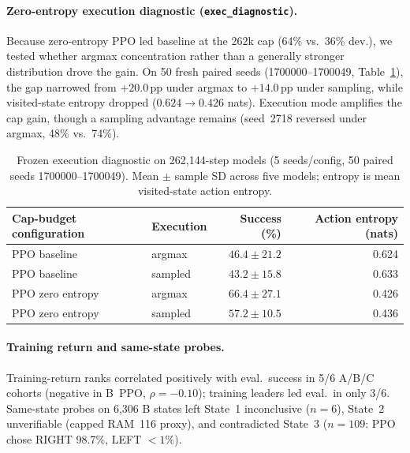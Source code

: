 \paragraph{Zero-entropy execution diagnostic (\texttt{exec\_diagnostic}).}
Because zero-entropy PPO led baseline at the 262k cap (64\% vs.\ 36\% dev.), we tested whether
argmax concentration rather than a generally stronger distribution drove the gain. On 50 fresh
paired seeds (1700000--1700049, Table~\ref{tab:diagnostic}), the gap narrowed from $+20.0$\,pp
under argmax to $+14.0$\,pp under sampling, while visited-state entropy dropped ($0.624\to 0.426$ nats).
Execution mode amplifies the cap gain, though a sampling advantage remains (seed~2718 reversed under argmax, 48\% vs.\ 74\%).

\begin{table}[H]
\centering\small
\begin{tabular}{@{}llrr@{}}
\toprule
Cap-budget configuration & Execution & Success (\%) & Action entropy (nats) \\
\midrule
PPO baseline & argmax  & $46.4 \pm 21.2$ & 0.624 \\
PPO baseline & sampled & $43.2 \pm 15.8$ & 0.633 \\
PPO zero entropy & argmax  & $66.4 \pm 27.1$ & 0.426 \\
PPO zero entropy & sampled & $57.2 \pm 10.5$ & 0.436 \\
\bottomrule
\end{tabular}
\caption{Frozen execution diagnostic on 262,144-step models (5 seeds/config, 50 paired seeds 1700000--1700049). Mean $\pm$ sample SD across five models; entropy is mean visited-state action entropy.}
\label{tab:diagnostic}
\end{table}

\paragraph{Training return and same-state probes.}
Training-return ranks correlated positively with eval.\ success in 5/6 A/B/C cohorts (negative
in B~PPO, $\rho=-0.10$); training leaders led eval.\ in only 3/6. Same-state probes on 6,306 B
states left State~1 inconclusive ($n=6$), State~2 unverifiable (capped RAM~116 proxy), and
contradicted State~3 ($n=109$: PPO chose RIGHT 98.7\%, LEFT $<1\%$).
